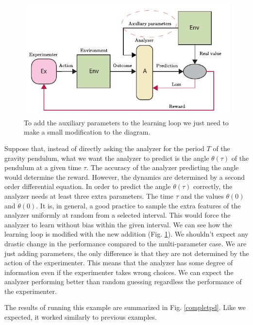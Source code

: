 \documentclass[11pt,a4paper,twoside]{report}
\newcommand{\+}{\textnormal{+} }
\theoremstyle{definition}
\numberwithin{equation}{chapter}
\begin{document}
  \begin{figure}
    \centering
    \includegraphics{figures/Auxiliary Parameters.pdf}
    \caption{To add the auxiliary parameters to the learning loop we just need
    to make a small modification to the diagram.}
    \label{fig:auxiliaryparameter}
  \end{figure}

  Suppose that, instead of directly asking the analyzer for the period $T$ of
  the gravity pendulum, what we want the analyzer to predict is the angle
  $\theta(\tau)$ of the pendulum at a given time $\tau$. The accuracy of the
  analyzer predicting the angle would determine the reward. However, the
  dynamics are determined by a second order differential equation. In order to
  predict the angle $\theta(\tau)$ correctly, the analyzer needs at least three
  extra parameters. The time $\tau$ and the values $\theta(0)$ and
  $\dot{\theta}(0)$. It is, in general, a good practice to sample the extra
  features of the analyzer uniformly at random from a selected interval. This
  would force the analyzer to learn without bias within the given interval. We
  can see how the learning loop is modified with the new addition (Fig.
  \ref{fig:auxiliaryparameter}). We shouldn't expect any drastic change in the
  performance compared to the multi-parameter case. We are just adding
  parameters, the only difference is that they are not determined by the
  action of the experimenter. This means that the analyzer has some
  degree of information even if the experimenter takes wrong choices. We can
  expect the analyzer performing better than random guessing regardless the
  performance of the experimenter.
  
  \par The results of running this example are summarized in 
  Fig. \ref{completpd}. Like we expected, it worked similarly to previous 
  examples.
\end{document}
